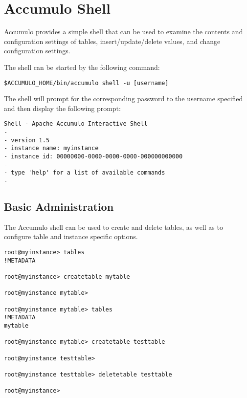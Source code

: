
%
%

\chapter{Accumulo Shell} 
Accumulo provides a simple shell that can be used to examine the contents and
configuration settings of tables, insert/update/delete values, and change
configuration settings. 

The shell can be started by the following command:

\small
\begin{verbatim}
$ACCUMULO_HOME/bin/accumulo shell -u [username]
\end{verbatim}

\normalsize

The shell will prompt for the corresponding password to the username specified
and then display the following prompt:

\small
\begin{verbatim}
Shell - Apache Accumulo Interactive Shell
-
- version 1.5
- instance name: myinstance
- instance id: 00000000-0000-0000-0000-000000000000
-
- type 'help' for a list of available commands
-
\end{verbatim}
\normalsize

\section{Basic Administration}

The Accumulo shell can be used to create and delete tables, as well as to configure
table and instance specific options.

\small
\begin{verbatim}
root@myinstance> tables
!METADATA

root@myinstance> createtable mytable

root@myinstance mytable>

root@myinstance mytable> tables
!METADATA
mytable

root@myinstance mytable> createtable testtable

root@myinstance testtable>

root@myinstance testtable> deletetable testtable

root@myinstance>
\end{verbatim}
\normalsize


